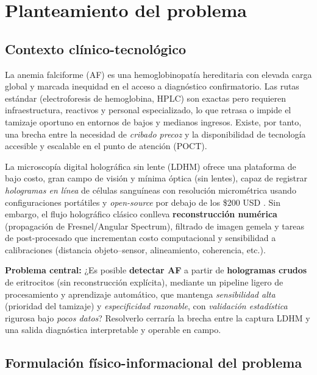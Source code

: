 \chapter{Planteamiento del problema}
\label{chap:problema}

\section{Contexto clínico-tecnológico}
La anemia falciforme (AF) es una hemoglobinopatía hereditaria con elevada carga global y marcada inequidad en el acceso a diagnóstico confirmatorio. Las rutas estándar (electroforesis de hemoglobina, HPLC) son exactas pero requieren infraestructura, reactivos y personal especializado, lo que retrasa o impide el tamizaje oportuno en entornos de bajos y medianos ingresos. Existe, por tanto, una brecha entre la necesidad de \emph{cribado precoz} y la disponibilidad de tecnología accesible y escalable en el punto de atención (POCT). 

La microscopía digital holográfica sin lente (LDHM) ofrece una plataforma de bajo costo, gran campo de visión y mínima óptica (sin lentes), capaz de registrar \emph{hologramas en línea} de células sanguíneas con resolución micrométrica usando configuraciones portátiles y \emph{open-source} por debajo de los \$200 USD \cite{Amann2019SciRep,BuitragoDuque2023HardwareX,Greenbaum2014STM}. Sin embargo, el flujo holográfico clásico conlleva \textbf{reconstrucción numérica} (propagación de Fresnel/Angular Spectrum), filtrado de imagen gemela y tareas de post-procesado que incrementan costo computacional y sensibilidad a calibraciones (distancia objeto–sensor, alineamiento, coherencia, etc.). 

\textbf{Problema central:} ¿Es posible \textbf{detectar AF} a partir de \textbf{hologramas crudos} de eritrocitos (sin reconstrucción explícita), mediante un pipeline ligero de procesamiento y aprendizaje automático, que mantenga \emph{sensibilidad alta} (prioridad del tamizaje) y \emph{especificidad razonable}, con \emph{validación estadística} rigurosa bajo \emph{pocos datos}? Resolverlo cerraría la brecha entre la captura LDHM y una salida diagnóstica interpretable y operable en campo.

\section{Formulación físico-informacional del problema}
